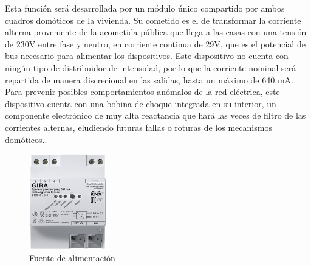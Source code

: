 Esta función será desarrollada por un módulo único compartido por ambos cuadros domóticos de la vivienda. Su cometido es el de transformar la corriente alterna proveniente de la acometida pública que llega a las casas con una tensión de 230V entre fase y neutro, en corriente continua de 29V, que es el potencial de bus necesario para alimentar los dispositivos. Este dispositivo no cuenta con ningún tipo de distribuidor de intensidad, por lo que la corriente nominal será repartida de manera discrecional en las salidas, hasta un máximo de 640 mA. Para prevenir posibles comportamientos anómalos de la red eléctrica, este dispositivo cuenta con una bobina de choque integrada en su interior, un componente electrónico de muy alta reactancia que hará las veces de filtro de las corrientes alternas, eludiendo futuras fallas o roturas de los mecanismos domóticos..
\begin{figure}[h]
\centering
\includegraphics[width=0.3\textwidth]{figures/fuente_alimentacion.png}   
\caption{Fuente de alimentación}
\label{fig:fuente_alimentacion}
\end{figure}
